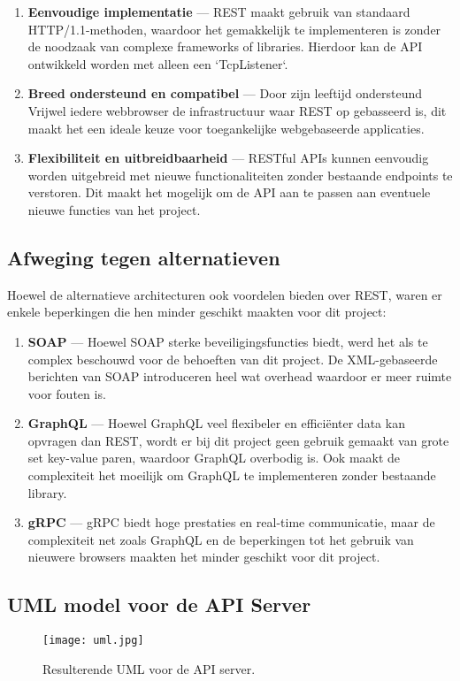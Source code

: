 \begin{enumerate}
    \item \textbf{Eenvoudige implementatie} --- REST maakt gebruik van standaard
     HTTP/1.1-methoden, waardoor het gemakkelijk te implementeren is zonder de
     noodzaak van complexe frameworks of libraries. Hierdoor kan de API ontwikkeld
     worden met alleen een `TcpListener`.
    \item \textbf{Breed ondersteund en compatibel} --- Door zijn leeftijd
     ondersteund Vrijwel iedere webbrowser de infrastructuur waar REST op
     gebasseerd is, dit maakt het een ideale keuze voor toegankelijke
     webgebaseerde applicaties.
    \item \textbf{Flexibiliteit en uitbreidbaarheid} --- RESTful APIs kunnen
     eenvoudig worden uitgebreid met nieuwe functionaliteiten zonder bestaande
     endpoints te verstoren. Dit maakt het mogelijk om de API aan te passen aan
     eventuele nieuwe functies van het project.
\end{enumerate}

\subsection{Afweging tegen alternatieven}
\label{ssec:afweging tegen alternatieven}
Hoewel de alternatieve architecturen ook voordelen bieden over REST,
waren er enkele beperkingen die hen minder geschikt maakten voor dit project:

\begin{enumerate}
    \item \textbf{SOAP} --- Hoewel SOAP sterke beveiligingsfuncties biedt,
     werd het als te complex beschouwd voor de behoeften van dit project.
     De XML-gebaseerde berichten van SOAP introduceren heel wat overhead
     waardoor er meer ruimte voor fouten is.
    \item \textbf{GraphQL} --- Hoewel GraphQL veel flexibeler en efficiënter
     data kan opvragen dan REST, wordt er bij dit project geen gebruik gemaakt
     van grote set key-value paren, waardoor GraphQL overbodig is. Ook maakt de
     complexiteit het moeilijk om GraphQL te implementeren zonder bestaande
     library.
    \item \textbf{gRPC} --- gRPC biedt hoge prestaties en real-time communicatie,
     maar de complexiteit net zoals GraphQL en de beperkingen tot het gebruik
     van nieuwere browsers maakten het minder geschikt voor dit project.
\end{enumerate}

\subsection{UML model voor de API Server}
\label{ssec:uml model voor de api server}
\begin{figure}[H]
    \texttt{[image: uml.jpg]}
    \caption{Resulterende UML voor de API server.}
    \label{fig:uml}
\end{figure}
